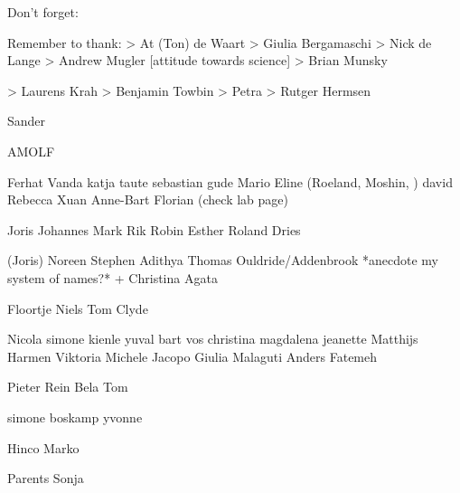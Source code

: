 Don't forget:



Remember to thank:
> At (Ton) de Waart
> Giulia Bergamaschi
> Nick de Lange
> Andrew Mugler [attitude towards science]
> Brian Munsky


> Laurens Krah
> Benjamin Towbin
> Petra
> Rutger Hermsen

Sander

AMOLF

Ferhat
Vanda
katja taute
sebastian gude
Mario
Eline
(Roeland, Moshin, )
david 
Rebecca
Xuan 
Anne-Bart
Florian
(check lab page)

Joris
Johannes
Mark
Rik
Robin
Esther
Roland Dries

(Joris)
Noreen
Stephen
Adithya
Thomas Ouldride/Addenbrook *anecdote my system of names?* + Christina
Agata

Floortje
Niels
Tom
Clyde

Nicola
simone kienle
yuval
bart vos
christina
magdalena
jeanette
Matthijs
Harmen
Viktoria
Michele
Jacopo
Giulia Malaguti
Anders
Fatemeh



Pieter Rein
Bela
Tom



simone boskamp
yvonne


Hinco
Marko


Parents
Sonja

















